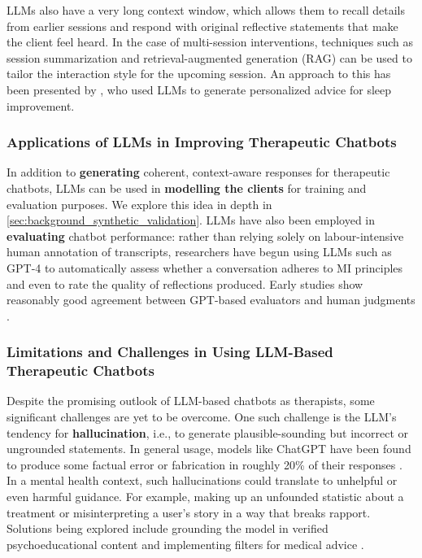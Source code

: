 LLMs also have a very long context window, which allows them to recall details from
earlier sessions and respond with original reflective statements that make the client
feel heard. In the case of multi-session interventions, techniques such as session
summarization and retrieval-augmented generation (RAG) can be used to tailor the
interaction style for the upcoming session. An approach to this has been presented by
\citet{corda2024context}, who used LLMs to generate personalized advice for sleep
improvement.

\subsubsection{Applications of LLMs in Improving Therapeutic Chatbots}
In addition to \textbf{generating} coherent, context-aware responses for therapeutic
chatbots, LLMs can be used in \textbf{modelling the clients} for training and
evaluation purposes. We explore this idea in depth in
\cref{sec:background_synthetic_validation}. LLMs have also been employed in
\textbf{evaluating} chatbot performance: rather than relying solely on labour-intensive
human annotation of transcripts, researchers have begun using LLMs such as GPT-4 to
automatically assess whether a conversation adheres to MI principles and even to rate
the quality of reflections produced. Early studies show reasonably good agreement
between GPT-based evaluators and human judgments \cite{Scholich2025}.

\subsubsection{Limitations and Challenges in Using LLM-Based Therapeutic Chatbots}
Despite the promising outlook of LLM-based chatbots as therapists, some significant
challenges are yet to be overcome. One such challenge is the LLM's tendency for
\textbf{hallucination}, i.e., to generate plausible-sounding but incorrect or
ungrounded statements. In general usage, models like ChatGPT have been found to produce
some factual error or fabrication in roughly 20\% of their responses \cite{Li2023}. In
a mental health context, such hallucinations could translate to unhelpful or even
harmful guidance. For example, making up an unfounded statistic about a treatment or
misinterpreting a user's story in a way that breaks rapport. Solutions being explored
include grounding the model in verified psychoeducational content and implementing
filters for medical advice \cite{Amugongo2025RAG}.

